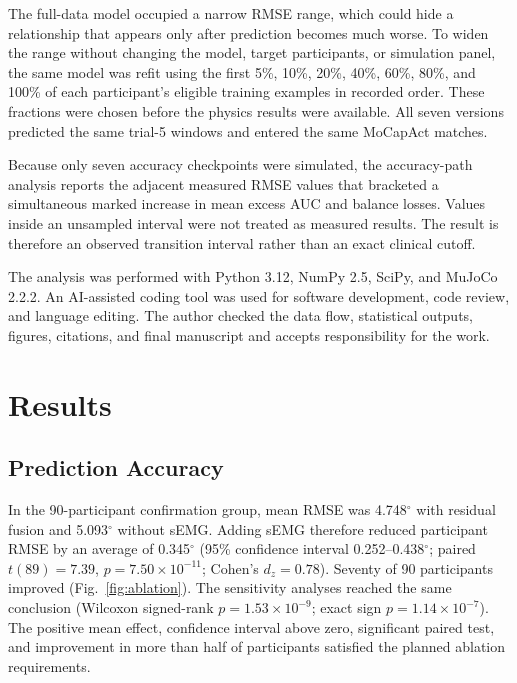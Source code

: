 \documentclass[referee,lineno,pdflatex,sn-vancouver-num]{sn-jnl}
\begin{document}
The full-data model occupied a narrow RMSE range, which could hide a relationship that appears only after prediction becomes much worse. To widen the range without changing the model, target participants, or simulation panel, the same model was refit using the first 5\%, 10\%, 20\%, 40\%, 60\%, 80\%, and 100\% of each participant's eligible training examples in recorded order. These fractions were chosen before the physics results were available. All seven versions predicted the same trial-5 windows and entered the same MoCapAct matches.

Because only seven accuracy checkpoints were simulated, the accuracy-path analysis reports the adjacent measured RMSE values that bracketed a simultaneous marked increase in mean excess AUC and balance losses. Values inside an unsampled interval were not treated as measured results. The result is therefore an observed transition interval rather than an exact clinical cutoff.

The analysis was performed with Python 3.12, NumPy 2.5, SciPy, and MuJoCo 2.2.2. An AI-assisted coding tool was used for software development, code review, and language editing. The author checked the data flow, statistical outputs, figures, citations, and final manuscript and accepts responsibility for the work.

\FloatBarrier

\section{Results}\label{sec:results}

\subsection{Prediction Accuracy}

In the 90-participant confirmation group, mean RMSE was 4.748$^{\circ}$ with residual fusion and 5.093$^{\circ}$ without sEMG. Adding sEMG therefore reduced participant RMSE by an average of 0.345$^{\circ}$ (95\% confidence interval 0.252--0.438$^{\circ}$; paired $t(89)=7.39$, $p=7.50\times10^{-11}$; Cohen's $d_z=0.78$). Seventy of 90 participants improved (Fig.~\ref{fig:ablation}). The sensitivity analyses reached the same conclusion (Wilcoxon signed-rank $p=1.53\times10^{-9}$; exact sign $p=1.14\times10^{-7}$). The positive mean effect, confidence interval above zero, significant paired test, and improvement in more than half of participants satisfied the planned ablation requirements.
\end{document}
